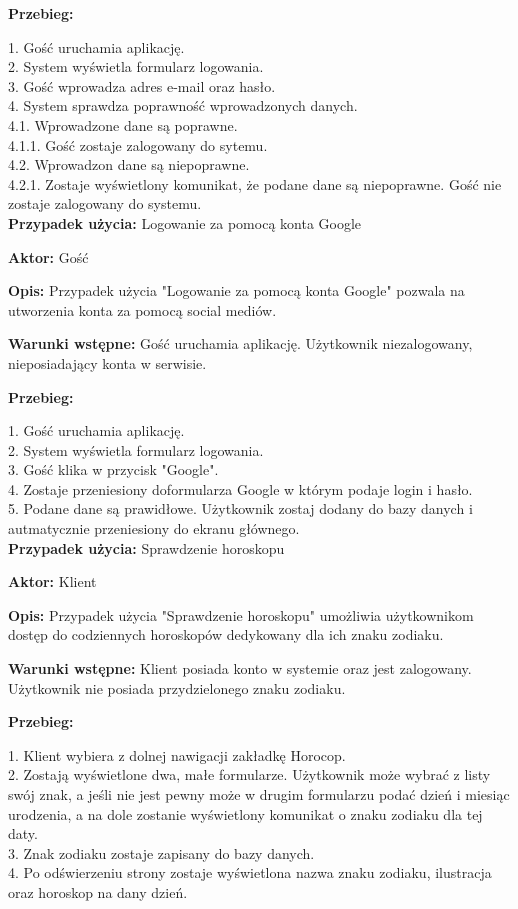 \textbf{Przebieg:}

1. Gość uruchamia aplikację. \\
2. System wyświetla formularz logowania. \\
3. Gość wprowadza adres e-mail oraz hasło. \\
4. System sprawdza poprawność wprowadzonych danych. \\
	4.1. Wprowadzone dane są poprawne. \\
		4.1.1. Gość zostaje zalogowany do sytemu. \\
	4.2. Wprowadzon dane są niepoprawne.\\
		4.2.1. Zostaje wyświetlony komunikat, że podane dane są niepoprawne. Gość nie zostaje zalogowany do systemu.\\
		

\textbf{Przypadek użycia:} Logowanie za pomocą konta Google

\textbf{Aktor:} Gość

\textbf{Opis:} Przypadek użycia "Logowanie za pomocą konta Google" pozwala na utworzenia konta za pomocą social mediów.

\textbf{Warunki wstępne:} Gość uruchamia aplikację. Użytkownik niezalogowany, nieposiadający konta w serwisie.

\textbf{Przebieg:}

1. Gość uruchamia aplikację. \\
2. System wyświetla formularz logowania. \\
3. Gość klika w przycisk "Google".\\
4. Zostaje przeniesiony doformularza Google w którym podaje login i hasło.\\
5. Podane dane są prawidłowe. Użytkownik zostaj dodany do bazy danych i autmatycznie przeniesiony do ekranu głównego.\\


\textbf{Przypadek użycia:} Sprawdzenie horoskopu

\textbf{Aktor:} Klient

\textbf{Opis:} Przypadek użycia "Sprawdzenie horoskopu" umożliwia użytkownikom dostęp do
codziennych horoskopów dedykowany dla ich znaku zodiaku.

\textbf{Warunki wstępne:} Klient posiada konto w systemie oraz jest zalogowany. Użytkownik nie posiada przydzielonego znaku zodiaku.

\textbf{Przebieg:}

1. Klient wybiera z dolnej nawigacji zakładkę Horocop.\\
2. Zostają wyświetlone dwa, małe formularze. Użytkownik może wybrać z listy swój znak, a jeśli nie jest pewny może w drugim formularzu podać dzień i miesiąc urodzenia, a na dole zostanie wyświetlony komunikat o znaku zodiaku dla tej daty. \\
3. Znak zodiaku zostaje zapisany do bazy danych. \\
4. Po odświerzeniu strony zostaje wyświetlona nazwa znaku zodiaku, ilustracja oraz horoskop na dany dzień.\\


